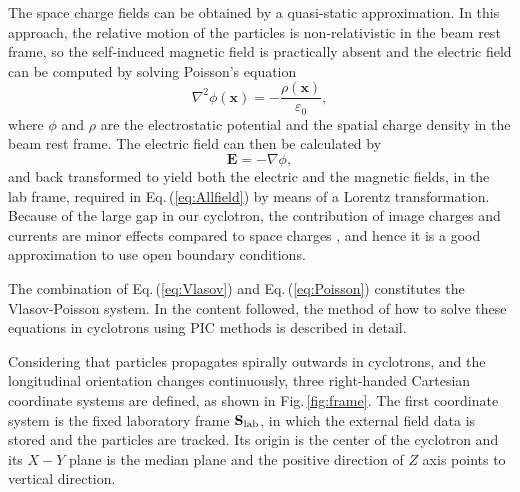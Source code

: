 \documentclass[aps,prstab,onecolumn,superscriptaddress,showpacs]{revtex4}
\newcommand{\bs}[1]{\mathbf #1}
\begin{document}
The space charge fields can be obtained
by a quasi-static approximation. In this approach, the relative motion of the particles is non-relativistic in the beam rest frame, so the self-induced magnetic field is practically absent and the electric field can be computed by solving Poisson's equation
\begin{equation}\label{eq:Poisson}
  \nabla^{2} \phi(\bs{x}) = - \frac{\rho(\bs{x})}{\varepsilon_0},
\end{equation}
where $\phi$ and $\rho$ are the electrostatic potential and the spatial charge density in the beam rest frame. The electric field can then be calculated by
\begin{equation}\label{eq:Efield}
  \bs{E}=-\nabla\phi,
\end{equation}
and back transformed to yield both the electric and the magnetic fields, in the lab frame, required in Eq.\,(\ref{eq:Allfield}) by means of a Lorentz transformation.
Because of the large gap in our cyclotron, the contribution of image charges and currents are minor effects compared to space charges \cite{Baartman:1}, and hence it is a good approximation to use 
open boundary conditions. 

The combination of Eq.\,(\ref{eq:Vlasov}) and Eq.\,(\ref{eq:Poisson}) constitutes the Vlasov-Poisson system. 
In the content followed, the method of how to solve these equations in cyclotrons using PIC methods is described in detail.

Considering that particles propagates spirally outwards in cyclotrons, and the longitudinal orientation changes continuously,
three right-handed Cartesian coordinate systems are defined, as shown in Fig.\,\ref{fig:frame}.  
The first coordinate system is the fixed laboratory frame ${\bs{S}_{\RM{lab}}}$, in which the external field data is stored and the particles are tracked. 
Its origin is the center of the cyclotron and its $X-Y$ plane is the median plane and the positive direction of $Z$ axis points to vertical direction.
\end{document}
